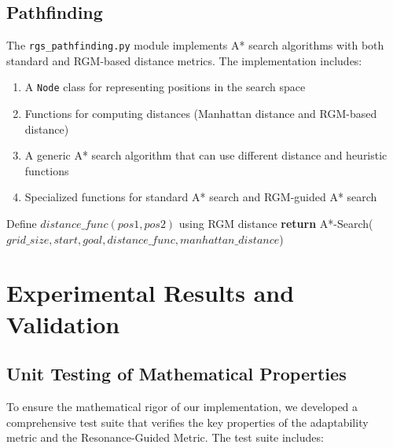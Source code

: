 \documentclass{article}
\begin{document}
\subsection{Pathfinding}
The \texttt{rgs\_pathfinding.py} module implements A* search algorithms with both standard and RGM-based distance metrics. The implementation includes:

\begin{enumerate}
    \item A \texttt{Node} class for representing positions in the search space
    \item Functions for computing distances (Manhattan distance and RGM-based distance)
    \item A generic A* search algorithm that can use different distance and heuristic functions
    \item Specialized functions for standard A* search and RGM-guided A* search
\end{enumerate}

\begin{algorithm}
\caption{RGM-Guided A* Search}
\begin{algorithmic}[1]
\State Define $distance\_func(pos1, pos2)$ using RGM distance
\State \textbf{return} A*-Search($grid\_size, start, goal, distance\_func, manhattan\_distance$)
\EndProcedure
\end{algorithmic}
\end{algorithm}

\section{Experimental Results and Validation}

\subsection{Unit Testing of Mathematical Properties}
To ensure the mathematical rigor of our implementation, we developed a comprehensive test suite that verifies the key properties of the adaptability metric and the Resonance-Guided Metric. The test suite includes:
\end{document}
